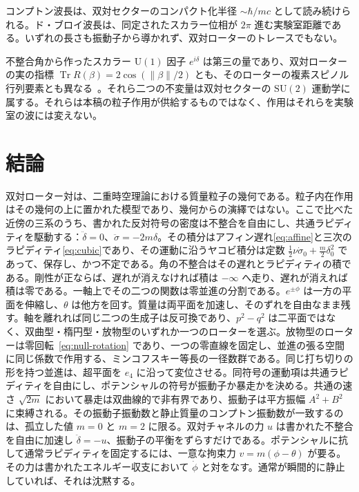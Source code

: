 \documentclass[a4paper]{article}
\begin{document}
コンプトン波長は、双対セクターのコンパクト化半径 \(\sim\hbar/mc\) として読み続けられる。ド・ブロイ波長は、同定されたスカラー位相が \(2\pi\) 進む実験室距離である。いずれの長さも振動子から導かれず、双対ローターのトレースでもない。

不整合角から作ったスカラー \(\mathrm{U}(1)\) 因子 \(e^{i\delta}\) は第三の量であり、双対ローターの実の指標 \(\operatorname{Tr} R(\beta)=2\cos(\lVert\beta\rVert/2)\) とも、そのローターの複素スピノル行列要素とも異なる~\cite{dst-de-broglie-wave}。それら二つの不変量は双対セクターの \(\mathrm{SU}(2)\) 運動学に属する。それらは本稿の粒子作用が供給するものではなく、作用はそれらを実験室の波には変えない。

\section{結論}

双対ローター対は、二重時空理論における質量粒子の幾何である。粒子内在作用はその幾何の上に置かれた模型であり、幾何からの演繹ではない。ここで比べた近傍の三系のうち、書かれた反対符号の密度は不整合を自由にし、共通ラピディティを駆動する：\(\ddot\delta=0\)、\(\ddot\sigma=-2m\delta\)。その積分はアフィン遅れ\eqref{eq:affine}と三次のラピディティ\eqref{eq:cubic}であり、その運動に沿うヤコビ積分は定数 \(\frac12\nu\dot\sigma_0+\frac m2\delta_0^2\) であって、保存し、かつ不定である。角の不整合はその遅れとラピディティの積である。剛性が正ならば、遅れが消えなければ積は \(-\infty\) へ走り、遅れが消えれば積は零である。一軸上でその二つの関数は零並進の分割である。\(e^{\pm\phi}\) は一方の平面を伸縮し、\(\theta\) は他方を回す。質量は両平面を加速し、そのずれを自由なまま残す。軸を離れれば同じ二つの生成子は反可換であり、\(p^2-q^2\) は二平面ではなく、双曲型・楕円型・放物型のいずれか一つのローターを選ぶ。放物型のローターは零回転~\eqref{eq:null-rotation} であり、一つの零直線を固定し、並進の張る空間に同じ係数で作用する、ミンコフスキー等長の一径数群である。同じ打ち切りの形を持つ並進は、超平面を \(e_4\) に沿って変位させる。同符号の運動項は共通ラピディティを自由にし、ポテンシャルの符号が振動子か暴走かを決める。共通の速さ \(\sqrt{2m}\) において暴走は双曲線的で非有界であり、振動子は平方振幅 \(A^2+B^2\) に束縛される。その振動子振動数と静止質量のコンプトン振動数が一致するのは、孤立した値 \(m=0\) と \(m=2\) に限る。双対チャネルの力 \(u\) は書かれた不整合を自由に加速し \(\ddot\delta=-u\)、振動子の平衡をずらすだけである。ポテンシャルに抗して通常ラピディティを固定するには、一意な拘束力 \(v=m(\phi-\theta)\) が要る。その力は書かれたエネルギー収支において \(\dot\phi\) と対をなす。通常が瞬間的に静止していれば、それは沈黙する。
\end{document}
